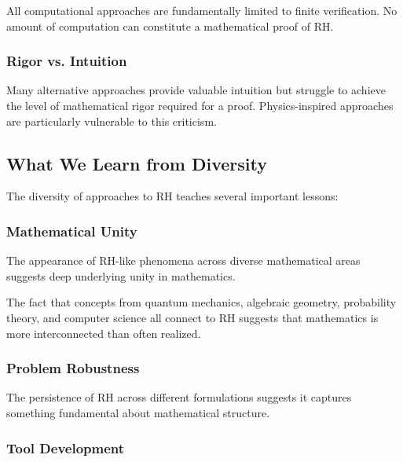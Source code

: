 \begin{obstacle}
All computational approaches are fundamentally limited to finite verification. No amount of computation can constitute a mathematical proof of RH.
\end{obstacle}

\subsubsection{Rigor vs. Intuition}

\begin{obstacle}
Many alternative approaches provide valuable intuition but struggle to achieve the level of mathematical rigor required for a proof. Physics-inspired approaches are particularly vulnerable to this criticism.
\end{obstacle}

\subsection{What We Learn from Diversity}

The diversity of approaches to RH teaches several important lessons:

\subsubsection{Mathematical Unity}

The appearance of RH-like phenomena across diverse mathematical areas suggests deep underlying unity in mathematics.

\begin{philosophy}
The fact that concepts from quantum mechanics, algebraic geometry, probability theory, and computer science all connect to RH suggests that mathematics is more interconnected than often realized.
\end{philosophy}

\subsubsection{Problem Robustness}

The persistence of RH across different formulations suggests it captures something fundamental about mathematical structure.

\subsubsection{Tool Development}

